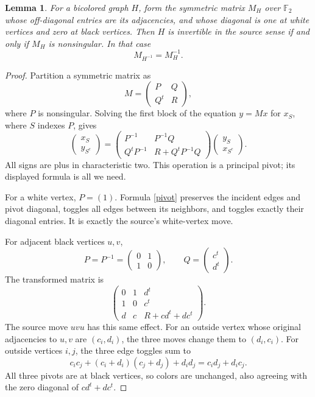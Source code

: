 \documentclass[11pt]{article}
\newtheorem{lemma}{Lemma}
\newcommand{\F}{\mathbb F_2}
\begin{document}
\begin{lemma}\label{matrix}
For a bicolored graph \(H\), form the symmetric matrix \(M_H\) over
\(\F\) whose off-diagonal entries are its adjacencies, and whose
diagonal is one at white vertices and zero at black vertices.
Then \(H\) is invertible in the source sense if and only if \(M_H\)
is nonsingular. In that case
\[
 M_{H^{-1}}=M_H^{-1}.
\]
\end{lemma}
\begin{proof}
Partition a symmetric matrix as
\[
 M=\begin{pmatrix}P&Q\\Q^t&R\end{pmatrix},
\]
where \(P\) is nonsingular. Solving the first block of the equation
\(y=Mx\) for \(x_S\), where \(S\) indexes \(P\), gives
\begin{equation}\label{pivot}
 \begin{pmatrix}x_S\\y_{S^c}\end{pmatrix}
 =
 \begin{pmatrix}
 P^{-1}&P^{-1}Q\\
 Q^tP^{-1}&R+Q^tP^{-1}Q
 \end{pmatrix}
 \begin{pmatrix}y_S\\x_{S^c}\end{pmatrix}.
\end{equation}
All signs are plus in characteristic two.
This operation is a principal pivot; its displayed formula is all
we need.

For a white vertex, \(P=(1)\). Formula \eqref{pivot} preserves the
incident edges and pivot diagonal, toggles all edges between its
neighbors, and toggles exactly their diagonal entries. It is exactly
the source's white-vertex move.

For adjacent black vertices \(u,v\),
\[
 P=P^{-1}=\begin{pmatrix}0&1\\1&0\end{pmatrix},\qquad
 Q=\begin{pmatrix}c^t\\d^t\end{pmatrix}.
\]
The transformed matrix is
\begin{equation}\label{pair}
 \begin{pmatrix}
 0&1&d^t\\
 1&0&c^t\\
 d&c&R+cd^t+dc^t
 \end{pmatrix}.
\end{equation}
The source move \(uvu\) has this same effect.
For an outside vertex whose original adjacencies to \(u,v\) are
\((c_i,d_i)\), the three moves change them to \((d_i,c_i)\).
For outside vertices \(i,j\), the three edge toggles sum to
\[
 c_ic_j+(c_i+d_i)(c_j+d_j)+d_id_j
 =c_id_j+d_ic_j.
\]
All three pivots are at black vertices, so colors are unchanged,
also agreeing with the zero diagonal of \(cd^t+dc^t\).


\end{proof}
\end{document}
